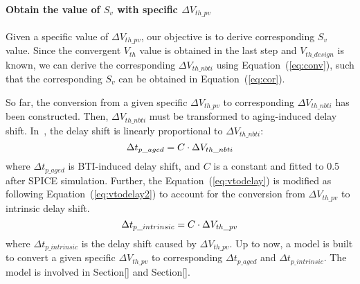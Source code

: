 \paragraph{Obtain the value of $S_{v}$ with specific $\Delta V_{th\_pv}$}
Given a specific value of $\Delta V_{th\_pv}$, our objective is to derive corresponding $S_{v}$ value. Since the convergent $V_{th}$ value is obtained in the last step and $V_{th\_design}$ is known, we can derive the corresponding $\Delta V_{th\_nbti}$ using Equation~(\ref{eq:conv}), such that the corresponding $S_{v}$ can be obtained in Equation~(\ref{eq:cor}). 

So far, the conversion from a given specific $\Delta V_{th\_pv}$ to corresponding $\Delta V_{th\_nbti}$ has been constructed. Then, $\Delta V_{th\_nbti}$ must be transformed to aging-induced delay shift. In~\cite{wang2007efficient}, the delay shift is linearly proportional to $\Delta V_{th\_nbti}$:
\begin{equation}
	\centering
	\fontsize{9}{9} \selectfont
	\Delta t_{p\_aged} = C \cdot \Delta V_{th\_nbti}
	\label{eq:vtodelay}
\end{equation}	
where $\Delta t_{p\_aged}$ is BTI-induced delay shift, and $C$ is a constant and fitted to 0.5 after SPICE simulation. Further, the Equation~(\ref{eq:vtodelay}) is modified as following Equation~(\ref{eq:vtodelay2}) to account for the conversion from $\Delta V_{th\_pv}$ to intrinsic delay shift. 
\begin{equation}
	\centering
	\fontsize{9}{9} \selectfont
	\Delta t_{p\_intrinsic} = C \cdot \Delta V_{th\_pv}
	\label{eq:vtodelay2}
\end{equation}	
where $\Delta t_{p\_intrinsic}$ is the delay shift caused by $\Delta V_{th\_pv}$. Up to now, a model is built to convert a given specific $\Delta V_{th\_pv}$ to corresponding $\Delta t_{p\_aged}$ and $\Delta t_{p\_intrinsic}$. The model is involved in Section[] and Section[]. 
